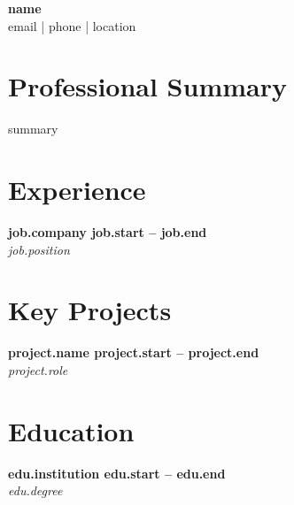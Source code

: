 \documentclass[letterpaper,11pt]{article}
\begin{document}
\begin{center}
    {\Large \textbf{ {{ name }} }} \\
    {{ email }} | {{ phone }} | {{ location }}
\end{center}

{%
\section{Professional Summary}
{{ summary }}
{%

\section{Experience}
{%
\textbf{ {{ job.company }} } \hfill \textbf{ {{ job.start }} -- {{ job.end }} } \\
\textit{ {{ job.position }} }{%
{%

{%
\section{Key Projects}
{%
\textbf{ {{ project.name }} } \hfill \textbf{ {{ project.start }} -- {{ project.end }} } \\
\textit{ {{ project.role }} } \\
{%
{%

{%
\section{Education}
{%
\textbf{ {{ edu.institution }} } \hfill \textbf{ {{ edu.start }} -- {{ edu.end }} } \\[2pt]
\textit{ {{ edu.degree }} }{%
{%
{%
{%
{%

}}}}}}}}}}}}}}}}
\end{document}
